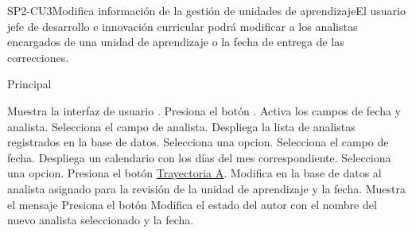 ﻿

\begin{UseCase}{SP2-CU3}{Modifica información de la gestión de unidades de aprendizaje}{El usuario jefe de desarrollo e innovación curricular podrá modificar a los analistas encargados de una unidad de aprendizaje o la fecha de entrega de las correcciones.}
\end{UseCase}

\begin{UCtrayectoria}{Principal}


    \UCpaso Muestra la interfaz de usuario .
    \UCpaso [\UCactor] Presiona el botón .
    \UCpaso Activa los campos de fecha y analista.
    \UCpaso [\UCactor] Selecciona el campo de analista.
    \UCpaso Despliega la lista de analistas registrados en la base de datos.
    \UCpaso[\UCactor] Selecciona una opcion.
    \UCpaso [\UCactor] Selecciona el campo de fecha.
    \UCpaso Despliega un calendario con los días del mes correspondiente.
    \UCpaso[\UCactor] Selecciona una opcion.
    \UCpaso [\UCactor] Presiona el botón  \hyperref[SP2-CU1-A]{Trayectoria A}.
    \UCpaso Modifica en la base de datos al analista asignado para la revisión de la unidad de aprendizaje y la fecha.
    \UCpaso Muestra el mensaje 
    \UCpaso[\UCactor] Presiona el botón 
    \UCpaso Modifica el estado del autor con el nombre del nuevo analista seleccionado y la fecha.
\end{UCtrayectoria}

